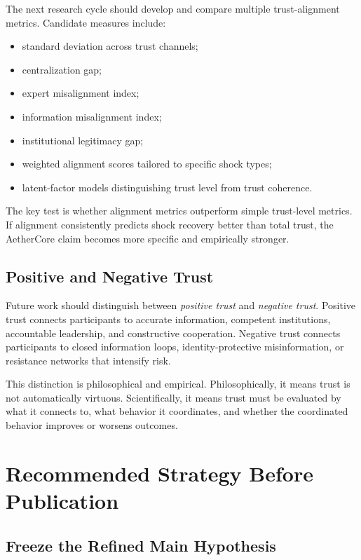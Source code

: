 \documentclass[12pt]{article}
\begin{document}
The next research cycle should develop and compare multiple trust-alignment metrics. Candidate measures include:

\begin{itemize}
  \item standard deviation across trust channels;
  \item centralization gap;
  \item expert misalignment index;
  \item information misalignment index;
  \item institutional legitimacy gap;
  \item weighted alignment scores tailored to specific shock types;
  \item latent-factor models distinguishing trust level from trust coherence.
\end{itemize}

The key test is whether alignment metrics outperform simple trust-level metrics. If alignment consistently predicts shock recovery better than total trust, the AetherCore claim becomes more specific and empirically stronger.

\subsection{Positive and Negative Trust}

Future work should distinguish between \textit{positive trust} and \textit{negative trust}. Positive trust connects participants to accurate information, competent institutions, accountable leadership, and constructive cooperation. Negative trust connects participants to closed information loops, identity-protective misinformation, or resistance networks that intensify risk.

This distinction is philosophical and empirical. Philosophically, it means trust is not automatically virtuous. Scientifically, it means trust must be evaluated by what it connects to, what behavior it coordinates, and whether the coordinated behavior improves or worsens outcomes.

\section{Recommended Strategy Before Publication}

\subsection{Freeze the Refined Main Hypothesis}
\end{document}
